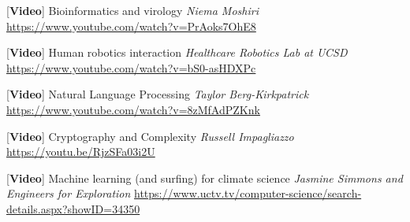 [{\bf Video}] Bioinformatics and virology {\it Niema Moshiri}
{\small \url{https://www.youtube.com/watch?v=PrAoks7OhE8}}

[{\bf Video}] Human robotics interaction {\it Healthcare Robotics Lab at UCSD}
{\small \url{https://www.youtube.com/watch?v=bS0-asHDXPc}}

[{\bf Video}] Natural Language Processing {\it Taylor Berg-Kirkpatrick}
{\small \url{https://www.youtube.com/watch?v=8zMfAdPZKnk}}

[{\bf Video}] Cryptography and Complexity {\it Russell Impagliazzo}
{\small \url{https://youtu.be/RjzSFa03i2U}}

[{\bf Video}] Machine learning (and surfing) for climate science {\it Jasmine Simmons and Engineers for Exploration}
{\small \url{https://www.uctv.tv/computer-science/search-details.aspx?showID=34350}}



